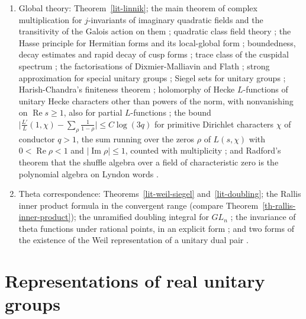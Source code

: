 \begin{theorem}
\begin{enumerate}
  Harish-Chandra modules \cite{HC53}; and Schur orthogonality
  \cite[Chapter~14]{Dix77}.
\item Global theory: Theorem~\ref{lit-linnik}; the main theorem of complex
  multiplication for $j$-invariants of imaginary quadratic fields and the
  transitivity of the Galois action on them \cite[Chapter~II]{Sil94}; quadratic
  class field theory \cite[Chapter~VI]{Neu99}; the Hasse principle for
  Hermitian forms and its local-global form \cite{Lan36,Jac62}; boundedness,
  decay estimates and rapid decay of cusp forms \cite{HC68,MW95}; trace class
  of the cuspidal spectrum \cite{GGPS69}; the factorisations of
  Dixmier-Malliavin and Flath \cite{DM78,Fla79}; strong approximation for
  special unitary groups \cite{Kne65,PR94}; Siegel sets for unitary groups
  \cite{Bor69,BHC62}; Harish-Chandra's finiteness theorem \cite{HC68};
  holomorphy of Hecke $L$-functions of unitary Hecke characters other than
  powers of the norm, with nonvanishing on $\operatorname{Re}s\ge1$, also for
  partial $L$-functions \cite{Hec20,Tat67,Lan94}; the bound
  $\bigl|\frac{L'}{L}(1,\chi)-\sum_\rho\frac1{1-\rho}\bigr|\le C\log(3q)$ for
  primitive Dirichlet characters $\chi$ of conductor $q>1$, the sum running
  over the zeros $\rho$ of $L(s,\chi)$ with $0<\operatorname{Re}\rho<1$ and
  $|\operatorname{Im}\rho|\le1$, counted with multiplicity
  \cite[Chapter~16]{Dav00}; and Radford's theorem that the shuffle algebra over
  a field of characteristic zero is the polynomial algebra on Lyndon words
  \cite{Rad79}.
\item Theta correspondence: Theorems~\ref{lit-weil-siegel}
  and~\ref{lit-doubling}; the Rallis inner product formula in the convergent
  range \cite{Ral84,Li92} (compare Theorem~\ref{th-rallis-inner-product}); the
  unramified doubling integral for $GL_n$ \cite{GPSR87,LR05}; the invariance of
  theta functions under rational points, in an explicit form \cite{Wei64}; and
  two forms of the existence of the Weil representation of a unitary dual
  pair \cite{Kud94,HKS96}.
\end{enumerate}
\end{theorem}

\section{Representations of real unitary groups}\label{section-lit-real}

